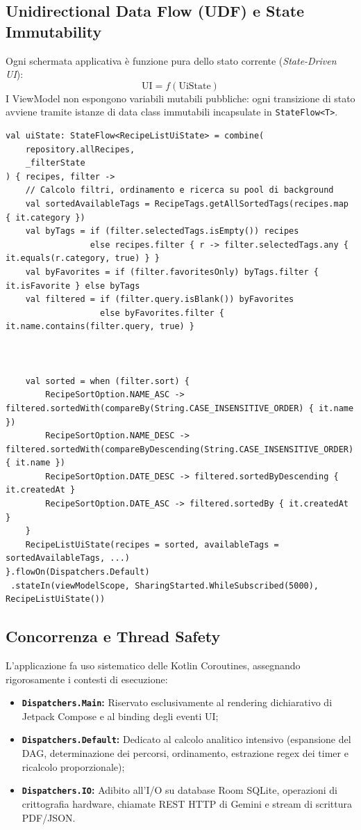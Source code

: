 \documentclass[11pt,a4paper,titlepage]{article}
\begin{document}
\subsection{Unidirectional Data Flow (UDF) e State Immutability}
Ogni schermata applicativa \`e funzione pura dello stato corrente (\textit{State-Driven UI}):
$$\text{UI} = f(\text{UiState})$$
I ViewModel non espongono variabili mutabili pubbliche: ogni transizione di stato avviene tramite istanze di data class immutabili incapsulate in \texttt{StateFlow<T>}.

\begin{lstlisting}[caption={Esempio di emissione di stato reattivo in RecipeListViewModel}]
val uiState: StateFlow<RecipeListUiState> = combine(
    repository.allRecipes,
    _filterState
) { recipes, filter ->
    // Calcolo filtri, ordinamento e ricerca su pool di background
    val sortedAvailableTags = RecipeTags.getAllSortedTags(recipes.map { it.category })
    val byTags = if (filter.selectedTags.isEmpty()) recipes 
                 else recipes.filter { r -> filter.selectedTags.any { it.equals(r.category, true) } }
    val byFavorites = if (filter.favoritesOnly) byTags.filter { it.isFavorite } else byTags
    val filtered = if (filter.query.isBlank()) byFavorites 
                   else byFavorites.filter { it.name.contains(filter.query, true) }
    
    
    
    val sorted = when (filter.sort) {
        RecipeSortOption.NAME_ASC -> filtered.sortedWith(compareBy(String.CASE_INSENSITIVE_ORDER) { it.name })
        RecipeSortOption.NAME_DESC -> filtered.sortedWith(compareByDescending(String.CASE_INSENSITIVE_ORDER) { it.name })
        RecipeSortOption.DATE_DESC -> filtered.sortedByDescending { it.createdAt }
        RecipeSortOption.DATE_ASC -> filtered.sortedBy { it.createdAt }
    }
    RecipeListUiState(recipes = sorted, availableTags = sortedAvailableTags, ...)
}.flowOn(Dispatchers.Default)
 .stateIn(viewModelScope, SharingStarted.WhileSubscribed(5000), RecipeListUiState())
\end{lstlisting}

\subsection{Concorrenza e Thread Safety}
L'applicazione fa uso sistematico delle Kotlin Coroutines, assegnando rigorosamente i contesti di esecuzione:
\begin{itemize}[leftmargin=*]
    \item \textbf{\texttt{Dispatchers.Main}:} Riservato esclusivamente al rendering dichiarativo di Jetpack Compose e al binding degli eventi UI;
    \item \textbf{\texttt{Dispatchers.Default}:} Dedicato al calcolo analitico intensivo (espansione del DAG, determinazione dei percorsi, ordinamento, estrazione regex dei timer e ricalcolo proporzionale);
    \item \textbf{\texttt{Dispatchers.IO}:} Adibito all'I/O su database Room SQLite, operazioni di crittografia hardware, chiamate REST HTTP di Gemini e stream di scrittura PDF/JSON.
\end{itemize}
\end{document}
